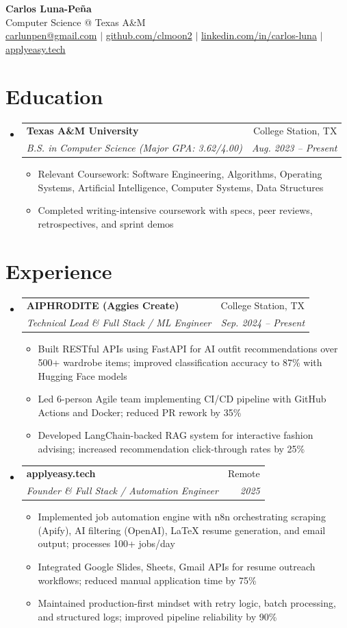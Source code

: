 \documentclass[letterpaper,11pt]{article}
\makeatletter
\newcommand{\resumeItem}[1]{
  \item\small{{#1 \vspace{-2pt}}}
}
\newcommand{\resumeSubheading}[4]{
  \vspace{-2pt}\item
    \begin{tabular*}{0.97\textwidth}[t]{l@{\extracolsep{\fill}}r}
      \textbf{#1} & #2 \\
      \textit{\small#3} & \textit{\small #4} \\
    \end{tabular*}\vspace{-7pt}
}
\newcommand{\resumeSubHeadingListStart}{\begin{itemize}[leftmargin=0.15in, label={}]}
\newcommand{\resumeSubHeadingListEnd}{\end{itemize}}
\newcommand{\resumeItemListStart}{\begin{itemize}}
\newcommand{\resumeItemListEnd}{\end{itemize}\vspace{-5pt}}
\makeatother
\begin{document}
\begin{center}
  \textbf{{\Huge Carlos Luna-Pe\~na}} \\
  Computer Science @ Texas A\&M \\
  \href{mailto:carlunpen@gmail.com}{carlunpen@gmail.com} $|$
  \href{https://github.com/clmoon2}{github.com/clmoon2} $|$
  \href{https://linkedin.com/in/carlos-luna}{linkedin.com/in/carlos-luna} $|$
  \href{https://applyeasy.tech}{applyeasy.tech}
\end{center}

\section{Education}
\resumeSubHeadingListStart
  \resumeSubheading
    {Texas A\&M University}{College Station, TX}
    {B.S. in Computer Science \textit{(Major GPA: 3.62/4.00)}}{Aug. 2023 -- Present}
    \resumeItemListStart
      \resumeItem{Relevant Coursework: Software Engineering, Algorithms, Operating Systems, Artificial Intelligence, Computer Systems, Data Structures}
      \resumeItem{Completed writing-intensive coursework with specs, peer reviews, retrospectives, and sprint demos}
    \resumeItemListEnd
\resumeSubHeadingListEnd

\section{Experience}
\resumeSubHeadingListStart
  \resumeSubheading
    {AIPHRODITE (Aggies Create)}{College Station, TX}
    {Technical Lead \& Full Stack / ML Engineer}{Sep. 2024 -- Present}
    \resumeItemListStart
      \resumeItem{Built RESTful APIs using FastAPI for AI outfit recommendations over 500+ wardrobe items; improved classification accuracy to 87\% with Hugging Face models}
      \resumeItem{Led 6-person Agile team implementing CI/CD pipeline with GitHub Actions and Docker; reduced PR rework by 35\%}
      \resumeItem{Developed LangChain-backed RAG system for interactive fashion advising; increased recommendation click-through rates by 25\%}
    \resumeItemListEnd

  \resumeSubheading
    {applyeasy.tech}{Remote}
    {Founder \& Full Stack / Automation Engineer}{2025}
    \resumeItemListStart
      \resumeItem{Implemented job automation engine with n8n orchestrating scraping (Apify), AI filtering (OpenAI), LaTeX resume generation, and email output; processes 100+ jobs/day}
      \resumeItem{Integrated Google Slides, Sheets, Gmail APIs for resume outreach workflows; reduced manual application time by 75\%}
      \resumeItem{Maintained production-first mindset with retry logic, batch processing, and structured logs; improved pipeline reliability by 90\%}
    \resumeItemListEnd
\resumeSubHeadingListEnd
\end{document}
